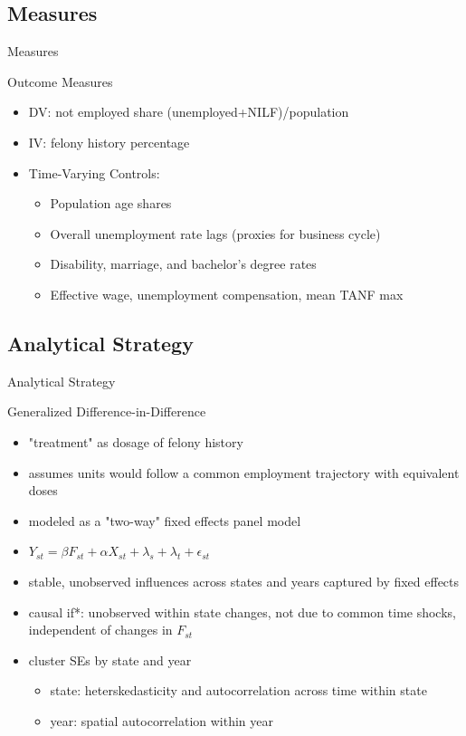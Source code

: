 \documentclass{beamer}\usepackage[]{graphicx}\usepackage[]{color}
\begin{document}
\subsection{Measures}

\begin{frame}{Measures}
\begin{block}{Outcome Measures}
\begin{itemize}

\item DV: not employed share (unemployed+NILF)/population 
\item IV: felony history percentage
\item Time-Varying Controls:
  \begin{itemize}
  \item Population age shares
  \item Overall unemployment rate lags (proxies for business cycle)
  \item Disability, marriage, and bachelor's degree rates
  \item Effective wage, unemployment compensation, mean TANF max
\end{itemize}

\end{itemize}
\end{block}
\end{frame}

\subsection{Analytical Strategy}


\begin{frame}{Analytical Strategy}
\begin{block}{Generalized Difference-in-Difference}
\begin{itemize}
\item "treatment" as dosage of felony history
\item assumes units would follow a common employment trajectory with equivalent doses
\item modeled as a "two-way" fixed effects panel model
\item $Y_{st} = \beta F_{st} + \alpha X_{st} + \lambda_s + \lambda_t + \epsilon_{st}$
\item stable, unobserved influences across states and years captured by fixed effects
\item causal if*: unobserved within state changes, not due to common time shocks, independent of changes in $F_{st}$
\item cluster SEs by state and year
  \begin{itemize}
  \item state: heterskedasticity and autocorrelation across time within state
  \item year: spatial autocorrelation within year
  \end{itemize}

\end{itemize}
\end{block}
\end{frame}
\end{document}
